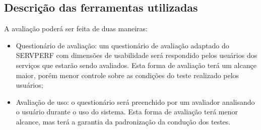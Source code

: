 	\subsection{Descrição das ferramentas utilizadas}
	A avaliação poderá ser feita de duas maneiras:
	\begin{itemize}
		\item Questionário de avaliação: um questionário de avaliação adaptado do SERVPERF com dimensões de usabilidade será respondido pelos usuários dos serviços que estarão sendo avaliados. Esta forma de avaliação terá um alcançe maior, porém menor controle sobre as condições do teste realizado pelos usuários;
		\item Avaliação de uso: o questionário será preenchido por um avaliador analisando o usuário durante o uso do sistema. Esta forma de avaliação terá menor alcance, mas terá a garantia da padronização da condução dos testes.
	\end{itemize}